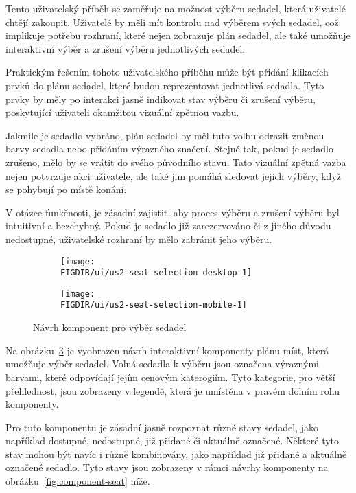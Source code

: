 Tento uživatelský příběh se zaměřuje na možnost výběru sedadel, která uživatelé chtějí zakoupit.
Uživatelé by měli mít kontrolu nad výběrem svých sedadel, což implikuje potřebu rozhraní, které nejen zobrazuje plán sedadel, ale také umožňuje interaktivní výběr a zrušení výběru jednotlivých sedadel.

Praktickým řešením tohoto uživatelského příběhu může být přidání klikacích prvků do plánu sedadel, které budou reprezentovat jednotlivá sedadla.
Tyto prvky by měly po interakci jasně indikovat stav výběru či zrušení výběru, poskytující uživateli okamžitou vizuální zpětnou vazbu.

Jakmile je sedadlo vybráno, plán sedadel by měl tuto volbu odrazit změnou barvy sedadla nebo přidáním výrazného značení.
Stejně tak, pokud je sedadlo zrušeno, mělo by se vrátit do svého původního stavu.
Tato vizuální zpětná vazba nejen potvrzuje akci uživatele, ale také jim pomáhá sledovat jejich výběry, když se pohybují po místě konání.

V otázce funkčnosti, je zásadní zajistit, aby proces výběru a zrušení výběru byl intuitivní a bezchybný.
Pokud je sedadlo již zarezervováno či z jiného důvodu nedostupné, uživatelské rozhraní by mělo zabránit jeho výběru.

\begin{figure}[H]
    \centering
    \begin{subfigure}{0.775\textwidth}
        \texttt{[image: \\FIGDIR/ui/us2-seat-selection-desktop-1]}
        \label{fig:us2-seat-selection-desktop-1}
    \end{subfigure}
    \begin{subfigure}{0.2\textwidth}
        \texttt{[image: \\FIGDIR/ui/us2-seat-selection-mobile-1]}
        \label{fig:us2-seat-selection-mobile-1}
    \end{subfigure}
    \caption{Návrh komponent pro výběr sedadel}
    \label{fig:us2-seat-selection}
\end{figure}

Na obrázku~\ref{fig:us2-seat-selection} je vyobrazen návrh interaktivní komponenty plánu míst, která umožňuje výběr sedadel.
Volná sedadla k výběru jsou označena výraznými barvami, které odpovídají jejím cenovým katerogiím.
Tyto kategorie, pro větší přehlednost, jsou zobrazeny v legendě, která je umístěna v pravém dolním rohu komponenty.

Pro tuto komponentu je zásadní jasně rozpoznat různé stavy sedadel, jako například dostupné, nedostupné, již přidané či aktuálně označené.
Některé tyto stav mohou být navíc i různě kombinovány, jako například již přidané a aktuálně označené sedadlo.
Tyto stavy jsou zobrazeny v rámci návrhy komponenty  na obrázku~\ref{fig:component-seat} níže.

